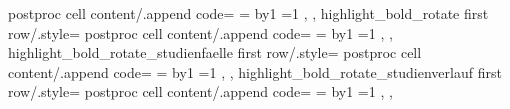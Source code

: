 {{        postproc cell content/.append code={
            =\pgfplotstablerow
            \advance{} by1
            \ifnum{}=1
            \fi
        },
    },
%
    highlight_bold_rotate first row/.style={																	%
        postproc cell content/.append code={
            =\pgfplotstablerow
            \advance{} by1
            \ifnum{}=1
            \fi
        },
    },
%
    highlight_bold_rotate_studienfaelle first row/.style={
        postproc cell content/.append code={
            =\pgfplotstablerow
            \advance{} by1
            \ifnum{}=1
            \fi
        },
    },
%
    highlight_bold_rotate_studienverlauf first row/.style={
        postproc cell content/.append code={
            =\pgfplotstablerow
            \advance{} by1
            \ifnum{}=1
            \fi
        },
    },
}

\newcommand{\styledefault}[1]{
\pgfplotstabletypeset[
	column type					= X,																			%
	every nth row				= {1}{before row = \hline},														%
	]{#1}
}

